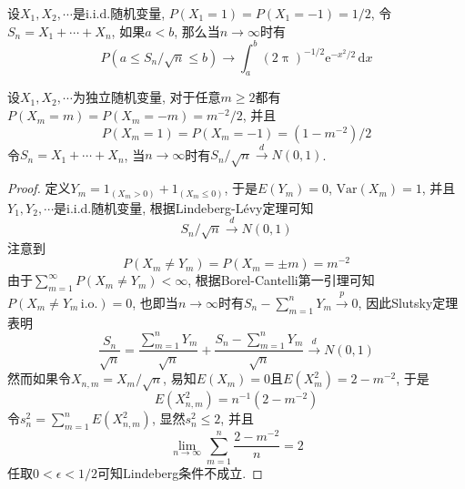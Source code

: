 \documentclass[cn, 12pt, math=mtpro2, bibstyle=apa, blue, twocol]{elegantbook}
\newcommand{\limn}{\lim_{n\to\infty}}
\begin{document}
\begin{corollary}
设$X_1,X_2,\cdots$是i.i.d.随机变量, $P(X_1=1)=P(X_1=-1)=1/2$, 令$S_n=X_1+\cdots+X_n$, 如果$a<b$, 那么当$n\to\infty$时有
$$P(a\leq S_n/\sqrt{n}\leq b)\to \int_{a}^{b}(2\uppi)^{-1/2}\text{e}^{-x^2/2}\,\text{d}x$$
\end{corollary}

\begin{example}[$\,$Lindeberg条件的非必要性]
设$X_1,X_2,\cdots$为独立随机变量, 对于任意$m\ge2$都有$P(X_m=m)=P(X_m=-m)=m^{-2}/2$, 并且
$$P(X_m=1)=P(X_m=-1)=(1-m^{-2})/2$$
令$S_n=X_1+\cdots+X_n$, 当$n\to\infty$时有$S_n/\sqrt{n}\xrightarrow{d}N(0,1)$.
\end{example}
\begin{proof}
  定义$Y_m=1_{(X_m>0)}+1_{(X_m\leq 0)}$, 于是$E(Y_m)=0$, $\text{Var}(X_m)=1$, 并且$Y_1,Y_2,\cdots$是i.i.d.随机变量, 根据Lindeberg-Lévy定理可知
  $$S_n/\sqrt{n}\xrightarrow{d}N(0,1)$$
  注意到
  $$P(X_m\neq Y_m)=P(X_m=\pm m)=m^{-2}$$
  由于$\sum_{m=1}^{\infty}P(X_m\neq Y_m)<\infty$, 根据Borel-Cantelli第一引理可知$P(X_m\neq Y_m\,\text{i.o.})=0$, 也即当$n\to\infty$时有$S_n-\sum_{m=1}^{n}Y_m\xrightarrow{p}0$, 因此Slutsky定理表明
  $$\frac{S_n}{\sqrt{n}}=\frac{\sum_{m=1}^{n}Y_m}{\sqrt{n}}+\frac{S_n-\sum_{m=1}^{n}Y_m}{\sqrt{n}}\xrightarrow{d}N(0,1)$$
  然而如果令$X_{n,m}=X_m/\sqrt{n}$, 易知$E(X_m)=0$且$E(X_m^2)=2-m^{-2}$, 于是
  $$E(X_{n,m}^2)=n^{-1}(2-m^{-2})$$
  令$s_n^2=\sum_{m=1}^{n}E(X_{n,m}^2)$, 显然$s_n^2\leq 2$, 并且
  $$\limn \sum_{m=1}^{n}\frac{2-m^{-2}}{n}=2$$
  任取$0<\epsilon<1/2$可知Lindeberg条件不成立.
\end{proof}
\end{document}
